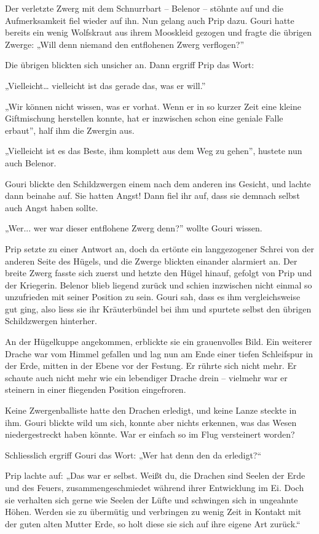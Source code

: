 Der verletzte Zwerg mit dem Schnurrbart – Belenor – stöhnte auf und die Aufmerksamkeit fiel wieder auf ihn. Nun gelang auch Prip dazu. Gouri hatte bereits ein wenig Wolfskraut aus ihrem Mooskleid gezogen und fragte die übrigen Zwerge: „Will denn niemand den entflohenen Zwerg verflogen?”

Die übrigen blickten sich unsicher an. Dann ergriff Prip das Wort:

„Vielleicht… vielleicht ist das gerade das, was er will.”

„Wir können nicht wissen, was er vorhat. Wenn er in so kurzer Zeit eine kleine Giftmischung herstellen konnte, hat er inzwischen schon eine geniale Falle erbaut”, half ihm die Zwergin aus.

„Vielleicht ist es das Beste, ihm komplett aus dem Weg zu gehen”, hustete nun auch Belenor.

Gouri blickte den Schildzwergen einem nach dem anderen ins Gesicht, und lachte dann beinahe auf. Sie hatten Angst! Dann fiel ihr auf, dass sie demnach selbst auch Angst haben sollte.

„Wer... wer war dieser entflohene Zwerg denn?” wollte Gouri wissen.

Prip setzte zu einer Antwort an, doch da ertönte ein langgezogener Schrei von der anderen Seite des Hügels, und die Zwerge blickten einander alarmiert an. Der breite Zwerg fasste sich zuerst und hetzte den Hügel hinauf, gefolgt von Prip und der Kriegerin. Belenor blieb liegend zurück und schien inzwischen nicht einmal so unzufrieden mit seiner Position zu sein. Gouri sah, dass es ihm vergleichsweise gut ging, also liess sie ihr Kräuterbündel bei ihm und spurtete selbst den übrigen Schildzwergen hinterher.

An der Hügelkuppe angekommen, erblickte sie ein grauenvolles Bild. Ein weiterer Drache war vom Himmel gefallen und lag nun am Ende einer tiefen Schleifspur in der Erde, mitten in der Ebene vor der Festung. Er rührte sich nicht mehr. Er schaute auch nicht mehr wie ein lebendiger Drache drein – vielmehr war er steinern in einer fliegenden Position eingefroren.

Keine Zwergenballiste hatte den Drachen erledigt, und keine Lanze steckte in ihm. Gouri blickte wild um sich, konnte aber nichts erkennen, was das Wesen niedergestreckt haben könnte. War er einfach so im Flug versteinert worden?

Schliesslich ergriff Gouri das Wort: „Wer hat denn den da erledigt?“

Prip lachte auf: „Das war er selbst. Weißt du, die Drachen sind Seelen der Erde und des Feuers, zusammengeschmiedet während ihrer Entwicklung im Ei. Doch sie verhalten sich gerne wie Seelen der Lüfte und schwingen sich in ungeahnte Höhen. Werden sie zu übermütig und verbringen zu wenig Zeit in Kontakt mit der guten alten Mutter Erde, so holt diese sie sich auf ihre eigene Art zurück.“


